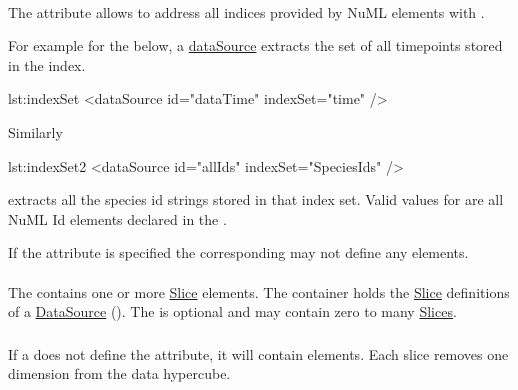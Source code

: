 \paragraph*{}
\label{sec:indexSet}
The  attribute allows to address all indices provided by NuML elements with . 

For example for the   below, a \hyperref[class:dataSource]{dataSource} extracts the set of all timepoints stored in the index.

\begin{myXmlLst}{}{lst:indexSet}
<dataSource id="dataTime" indexSet="time" />
\end{myXmlLst} 

Similarly

\begin{myXmlLst}{}{lst:indexSet2}
<dataSource id="allIds" indexSet="SpeciesIds" />
\end{myXmlLst} 

extracts all the species id strings stored in that index set. Valid values for  are all NuML Id elements declared in the . 

If the  attribute is specified the corresponding  may not define any  elements.


\paragraph*{}
\label{class:listOfSlices}
The  contains one or more \hyperref[class:slice]{Slice} elements. The  container holds the \hyperref[class:slice]{Slice} definitions of a \hyperref[class:dataSource]{DataSource} (). The  is optional and may contain zero to many \hyperref[class:slice]{Slices}.


\subsubsection{}
\label{class:slice}
If a \SedDataSource does not define the \hyperref[sec:indexSet]{} attribute, it will contain  elements. Each slice removes one dimension from the data hypercube.

